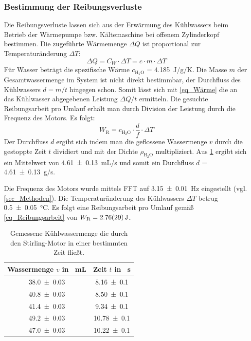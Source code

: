 \documentclass[
	a4paper,
	12pt,
	pagesize,
	ngerman
]{scrartcl}
\begin{document}
	\subsubsection{Bestimmung der Reibungsverluste}
	Die Reibungsverluste lassen sich aus der Erwärmung des Kühlwassers beim Betrieb der Wärmepumpe bzw. Kältemaschine bei offenem Zylinderkopf bestimmen.
	Die zugeführte Wärmemenge $\Delta{Q}$ ist proportional zur Temperaturänderung $\Delta{T}$:
	\begin{equation}
	\Delta{Q} = C_W \cdot \Delta{T} = c \cdot m \cdot \Delta{T}
	\label{eq_Wärme}
	\end{equation} 
	Für Wasser beträgt die spezifische Wärme $c_{\text{H}_2\text{O}}$ = \SI{4,185}{J/g/K}. %
	Die Masse $m$ der Gesamtwassermenge im System ist nicht direkt bestimmbar, der Durchfluss des Kühlwassers $d=m/t$ hingegen schon.
	Somit lässt sich mit \cref{eq_Wärme} die an das Kühlwasser abgegebenen Leistung $\Delta{Q}/t$ ermitteln.
	Die gesuchte Reibungsarbeit pro Umlauf erhält man durch Division der Leistung durch die Frequenz des Motors.
	Es folgt:
	\begin{equation}
	W_\text{R} = c_{\text{H}_2\text{O}} \cdot \frac{d}{f} \cdot \Delta{T} %
	\label{eq_Reibungsarbeit}
	\end{equation}
	Der Durchfluss $d$ ergibt sich indem man die geflossene Wassermenge $v$ durch die gestoppte Zeit $t$ dividiert und mit der Dichte $\rho_{\text{H}_2\text{O}}$ multipliziert. Aus \cref{tab_Durchfluss} ergibt sich ein Mittelwert von \SI{4,61+-0,13}{mL/s} und somit ein Durchfluss $d$ = \SI{4,61+-0,13}{g/s}.
	
	Die Frequenz des Motors wurde mittels FFT auf \SI{3,15+-0,01}{Hz} eingestellt (vgl. \cref{sec_Methoden}).
	Die Temperaturänderung des Kühlwassers $\Delta{T}$ betrug \SI{0,5+-0,05}{\degreeCelsius}.
	Es folgt eine Reibungsarbeit pro Umlauf gemäß \cref{eq_Reibungsarbeit} von $W_\text{R}=\SI{2,76+-0,29}{J}$.
	\begin{table}[H]
		\centering
		\begin{tabular}{ c | c }
			Wassermenge $v$ in \SI{}{mL} & Zeit $t$ in \SI{}{s} \\ \hline
			\SI{38,0+-0,03}{}&\SI{8,16+-0,1}{}\\
			\SI{40,8+-0,03}{}&\SI{8,50+-0,1}{}\\
			\SI{41,4+-0,03}{}&\SI{9,34+-0,1}{}\\
			\SI{49,2+-0,03}{}&\SI{10,78+-0,1}{}\\
			\SI{47,0+-0,03}{}&\SI{10,22+-0,1}{}\\
		\end{tabular}
		\caption{Gemessene Kühlwassermenge die durch den Stirling-Motor in einer bestimmten Zeit fließt.}
		\label{tab_Durchfluss} 
	\end{table}
	
\end{document}
